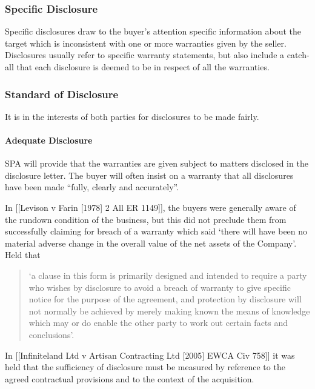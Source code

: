 \documentclass[
]{article}
\begin{document}
\hypertarget{specific-disclosure}{%
\subsubsection{Specific Disclosure}\label{specific-disclosure}}

Specific disclosures draw to the buyer's attention specific information
about the target which is inconsistent with one or more warranties given
by the seller. Disclosures usually refer to specific warranty
statements, but also include a catch-all that each disclosure is deemed
to be in respect of all the warranties.

\hypertarget{standard-of-disclosure}{%
\subsubsection{Standard of Disclosure}\label{standard-of-disclosure}}

It is in the interests of both parties for disclosures to be made
fairly.

\hypertarget{adequate-disclosure}{%
\paragraph{Adequate Disclosure}\label{adequate-disclosure}}

SPA will provide that the warranties are given subject to matters
disclosed in the disclosure letter. The buyer will often insist on a
warranty that all disclosures have been made ``fully, clearly and
accurately''.

In {[}{[}Levison v Farin {[}1978{]} 2 All ER 1149{]}{]}, the buyers were
generally aware of the rundown condition of the business, but this did
not preclude them from successfully claiming for breach of a warranty
which said `there will have been no material adverse change in the
overall value of the net assets of the Company'. Held that

\begin{quote}
`a clause in this form is primarily designed and intended to require a
party who wishes by disclosure to avoid a breach of warranty to give
specific notice for the purpose of the agreement, and protection by
disclosure will not normally be achieved by merely making known the
means of knowledge which may or do enable the other party to work out
certain facts and conclusions'.
\end{quote}

In {[}{[}Infiniteland Ltd v Artisan Contracting Ltd {[}2005{]} EWCA Civ
758{]}{]} it was held that the sufficiency of disclosure must be
measured by reference to the agreed contractual provisions and to the
context of the acquisition.
\end{document}
